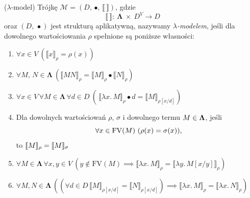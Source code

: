 \begin{definicja}\label{def:lambda-model-1}(\(\lambda\)-model) %
  Trójkę \(\mathcal{M}=(D,\,\bullet,\,\llbracket\,\rrbracket)\), gdzie 
   \[\llbracket\,\rrbracket:\:\mathbf{\Lambda}\ \times\ D^{V}\to D\]
  oraz \((D,\,\bullet)\) jest strukturą aplikatywną,
  nazywamy \emph{\(\lambda\)-modelem}, jeśli dla dowolnego wartościowania \(\rho\) spełnione są poniższe własności:
  \begin{enumerate}[label={(\roman*)}, ref={(\roman*)}]
    \setlength\itemsep{0em}
    \item \(\forall x \in V\ \left(\llbracket x \rrbracket_\rho = \rho(x)\right)\)\label{def:lambda-interpret-1}
    \item \(\forall M,\,N \in \mathbf{\Lambda}\ (\llbracket MN \rrbracket_\rho = \llbracket M\rrbracket_\rho \bullet \llbracket N \rrbracket_\rho)\)\label{def:lambda-interpret-2}
    \item \(\forall x \in V\,\forall M\in \mathbf{\Lambda}\,\forall d\in D\ (\, \llbracket \lambda x.\,M\rrbracket_\rho \bullet d = \llbracket M \rrbracket_{\rho[x/d]})\)\label{def:lambda-interpret-3}
    \item Dla dowolnych wartościowań \(\rho\),  \(\sigma\) i dowolnego termu \(M\in\nobreak\mathbf{\Lambda}\), jeśli \[\forall x\in\nobreak\mathrm{FV}(M)\ (\rho(x) =\nobreak \sigma(x)),\] to \(\llbracket M\rrbracket_\rho =\nobreak\llbracket M \rrbracket_\sigma\)\label{def:lambda-interpret-4}
    \item \(\forall M\in\mathbf{\Lambda}\,\forall x, y\in V\ (y\not\in\mathrm{FV}(M)\implies \llbracket\lambda x.\,M\rrbracket_\rho = \llbracket \lambda y.\,M[x/y]\rrbracket_\rho)\)\label{def:lambda-interpret-5}
    \item \(\forall M,N\in\mathbf{\Lambda}\,\left(\left(\forall d\in D\, \llbracket M \rrbracket_{\rho[x/d]}=\llbracket N \rrbracket_{\rho[x/d]}\right)\implies \llbracket \lambda x.\,M \rrbracket_\rho=\llbracket \lambda x.\,N\rrbracket_\rho\right)\)\label{def:lambda-interpret-6}
  \end{enumerate}


\end{definicja}
